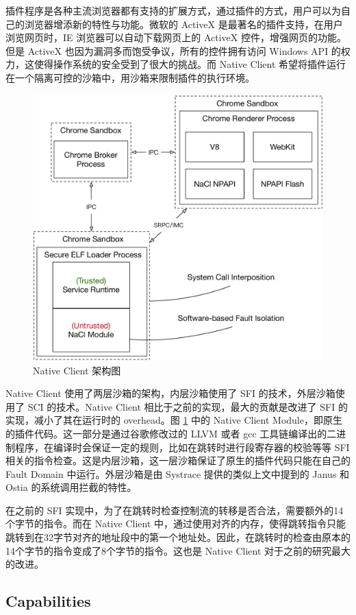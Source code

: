 \documentclass[final,12pt]{elsarticle}
\begin{document}
插件程序是各种主流浏览器都有支持的扩展方式，通过插件的方式，用户可以为自己的浏览器增添新的特性与功能。微软的 ActiveX 是最著名的插件支持，在用户浏览网页时，IE 浏览器可以自动下载网页上的 ActiveX 控件，增强网页的功能。但是 ActiveX 也因为漏洞多而饱受争议，所有的控件拥有访问 Windows API 的权力，这使得操作系统的安全受到了很大的挑战。而 Native Client 希望将插件运行在一个隔离可控的沙箱中，用沙箱来限制插件的执行环境。

\begin{figure}
\centering
\includegraphics[width=0.65\linewidth]{imgs/nacl}
\caption{Native Client 架构图}
\label{fig:nacl}
\end{figure}

Native Client 使用了两层沙箱的架构，内层沙箱使用了 SFI 的技术，外层沙箱使用了 SCI 的技术。Native Client 相比于之前的实现，最大的贡献是改进了 SFI 的实现，减小了其在运行时的 overhead。图 \ref{fig:nacl} 中的 Native Client Module，即原生的插件代码。这一部分是通过谷歌修改过的 LLVM 或者 gcc 工具链编译出的二进制程序，在编译时会保证一定的规则，比如在跳转时进行段寄存器的校验等等 SFI 相关的指令检查。这是内层沙箱，这一层沙箱保证了原生的插件代码只能在自己的 Fault Domain 中运行。外层沙箱是由 Systrace \cite{provos2003improving} 提供的类似上文中提到的 Janus 和 Ostia 的系统调用拦截的特性。

在之前的 SFI 实现中，为了在跳转时检查控制流的转移是否合法，需要额外的14个字节的指令。而在 Native Client 中，通过使用对齐的内存，使得跳转指令只能跳转到在32字节对齐的地址段中的第一个地址处。因此，在跳转时的检查由原本的14个字节的指令变成了8个字节的指令。这也是 Native Client 对于之前的研究最大的改进。

\subsection{Capabilities}
\label{ss:capabilities}
\end{document}
